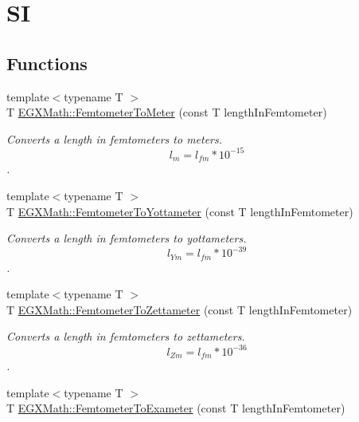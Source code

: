 \hypertarget{group___e_g_x_math-_conversions-_length_conversions-_s_i-_femtometer-_s_i}{}\section{SI}
\label{group___e_g_x_math-_conversions-_length_conversions-_s_i-_femtometer-_s_i}
\subsection*{Functions}
\begin{DoxyCompactItemize}
\item 
{\footnotesize template$<$typename T $>$ }\\T \mbox{\hyperlink{group___e_g_x_math-_conversions-_length_conversions-_s_i-_femtometer-_s_i_gad0ac4ef551ee703c8952fe04fbd90f78}{E\+G\+X\+Math\+::\+Femtometer\+To\+Meter}} (const T length\+In\+Femtometer)
\begin{DoxyCompactList}\small\item\em Converts a length in femtometers to meters. \[ l_{m}=l_{fm} * 10^{-15} \]. \end{DoxyCompactList}\item 
{\footnotesize template$<$typename T $>$ }\\T \mbox{\hyperlink{group___e_g_x_math-_conversions-_length_conversions-_s_i-_femtometer-_s_i_gabee380e1753dab5aa9aa433b8f3ce4d4}{E\+G\+X\+Math\+::\+Femtometer\+To\+Yottameter}} (const T length\+In\+Femtometer)
\begin{DoxyCompactList}\small\item\em Converts a length in femtometers to yottameters. \[ l_{Ym}=l_{fm} * 10^{-39} \]. \end{DoxyCompactList}\item 
{\footnotesize template$<$typename T $>$ }\\T \mbox{\hyperlink{group___e_g_x_math-_conversions-_length_conversions-_s_i-_femtometer-_s_i_ga4906b22484dc1005dd962a943a967b50}{E\+G\+X\+Math\+::\+Femtometer\+To\+Zettameter}} (const T length\+In\+Femtometer)
\begin{DoxyCompactList}\small\item\em Converts a length in femtometers to zettameters. \[ l_{Zm}=l_{fm} * 10^{-36} \]. \end{DoxyCompactList}\item 
{\footnotesize template$<$typename T $>$ }\\T \mbox{\hyperlink{group___e_g_x_math-_conversions-_length_conversions-_s_i-_femtometer-_s_i_ga44f78ba3f928c765acf6330b47ab3827}{E\+G\+X\+Math\+::\+Femtometer\+To\+Exameter}} (const T length\+In\+Femtometer)

\end{DoxyCompactItemize}
